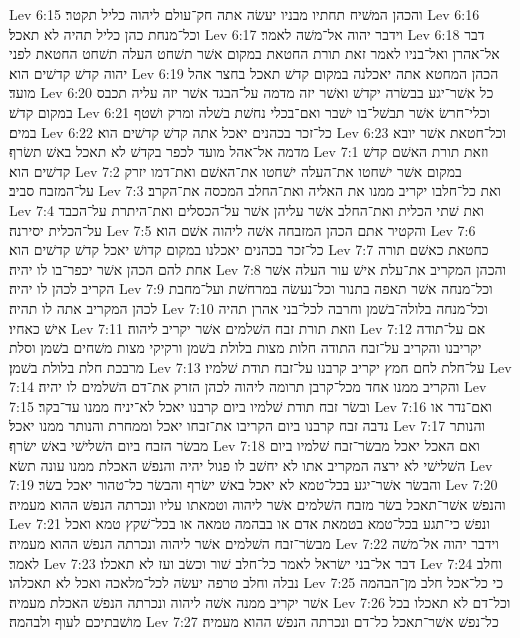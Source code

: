 Lev 6:15  והכהן המשׁיח תחתיו מבניו יעשׂה אתה חק־עולם ליהוה כליל תקטר׃
Lev 6:16  וכל־מנחת כהן כליל תהיה לא תאכל׃
Lev 6:17  וידבר יהוה אל־משׁה לאמר׃
Lev 6:18  דבר אל־אהרן ואל־בניו לאמר זאת תורת החטאת במקום אשׁר תשׁחט העלה תשׁחט החטאת לפני יהוה קדשׁ קדשׁים הוא׃
Lev 6:19  הכהן המחטא אתה יאכלנה במקום קדשׁ תאכל בחצר אהל מועד׃
Lev 6:20  כל אשׁר־יגע בבשׂרה יקדשׁ ואשׁר יזה מדמה על־הבגד אשׁר יזה עליה תכבס במקום קדשׁ׃
Lev 6:21  וכלי־חרשׂ אשׁר תבשׁל־בו ישׁבר ואם־בכלי נחשׁת בשׁלה ומרק ושׁטף במים׃
Lev 6:22  כל־זכר בכהנים יאכל אתה קדשׁ קדשׁים הוא׃
Lev 6:23  וכל־חטאת אשׁר יובא מדמה אל־אהל מועד לכפר בקדשׁ לא תאכל באשׁ תשׂרף׃
Lev 7:1  וזאת תורת האשׁם קדשׁ קדשׁים הוא׃
Lev 7:2  במקום אשׁר ישׁחטו את־העלה ישׁחטו את־האשׁם ואת־דמו יזרק על־המזבח סביב׃
Lev 7:3  ואת כל־חלבו יקריב ממנו את האליה ואת־החלב המכסה את־הקרב׃
Lev 7:4  ואת שׁתי הכלית ואת־החלב אשׁר עליהן אשׁר על־הכסלים ואת־היתרת על־הכבד על־הכלית יסירנה׃
Lev 7:5  והקטיר אתם הכהן המזבחה אשׁה ליהוה אשׁם הוא׃
Lev 7:6  כל־זכר בכהנים יאכלנו במקום קדושׁ יאכל קדשׁ קדשׁים הוא׃
Lev 7:7  כחטאת כאשׁם תורה אחת להם הכהן אשׁר יכפר־בו לו יהיה׃
Lev 7:8  והכהן המקריב את־עלת אישׁ עור העלה אשׁר הקריב לכהן לו יהיה׃
Lev 7:9  וכל־מנחה אשׁר תאפה בתנור וכל־נעשׂה במרחשׁת ועל־מחבת לכהן המקריב אתה לו תהיה׃
Lev 7:10  וכל־מנחה בלולה־בשׁמן וחרבה לכל־בני אהרן תהיה אישׁ כאחיו׃
Lev 7:11  וזאת תורת זבח השׁלמים אשׁר יקריב ליהוה׃
Lev 7:12  אם על־תודה יקריבנו והקריב על־זבח התודה חלות מצות בלולת בשׁמן ורקיקי מצות משׁחים בשׁמן וסלת מרבכת חלת בלולת בשׁמן׃
Lev 7:13  על־חלת לחם חמץ יקריב קרבנו על־זבח תודת שׁלמיו׃
Lev 7:14  והקריב ממנו אחד מכל־קרבן תרומה ליהוה לכהן הזרק את־דם השׁלמים לו יהיה׃
Lev 7:15  ובשׂר זבח תודת שׁלמיו ביום קרבנו יאכל לא־יניח ממנו עד־בקר׃
Lev 7:16  ואם־נדר או נדבה זבח קרבנו ביום הקריבו את־זבחו יאכל וממחרת והנותר ממנו יאכל׃
Lev 7:17  והנותר מבשׂר הזבח ביום השׁלישׁי באשׁ ישׂרף׃
Lev 7:18  ואם האכל יאכל מבשׂר־זבח שׁלמיו ביום השׁלישׁי לא ירצה המקריב אתו לא יחשׁב לו פגול יהיה והנפשׁ האכלת ממנו עונה תשׂא׃
Lev 7:19  והבשׂר אשׁר־יגע בכל־טמא לא יאכל באשׁ ישׂרף והבשׂר כל־טהור יאכל בשׂר׃
Lev 7:20  והנפשׁ אשׁר־תאכל בשׂר מזבח השׁלמים אשׁר ליהוה וטמאתו עליו ונכרתה הנפשׁ ההוא מעמיה׃
Lev 7:21  ונפשׁ כי־תגע בכל־טמא בטמאת אדם או בבהמה טמאה או בכל־שׁקץ טמא ואכל מבשׂר־זבח השׁלמים אשׁר ליהוה ונכרתה הנפשׁ ההוא מעמיה׃
Lev 7:22  וידבר יהוה אל־משׁה לאמר׃
Lev 7:23  דבר אל־בני ישׂראל לאמר כל־חלב שׁור וכשׂב ועז לא תאכלו׃
Lev 7:24  וחלב נבלה וחלב טרפה יעשׂה לכל־מלאכה ואכל לא תאכלהו׃
Lev 7:25  כי כל־אכל חלב מן־הבהמה אשׁר יקריב ממנה אשׁה ליהוה ונכרתה הנפשׁ האכלת מעמיה׃
Lev 7:26  וכל־דם לא תאכלו בכל מושׁבתיכם לעוף ולבהמה׃
Lev 7:27  כל־נפשׁ אשׁר־תאכל כל־דם ונכרתה הנפשׁ ההוא מעמיה׃
